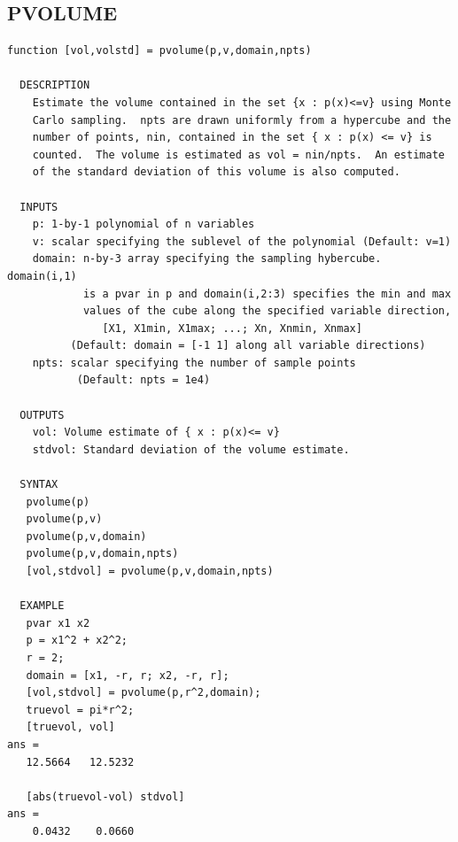 \documentclass{article}
\begin{document}
\subsection{PVOLUME}
\begin{verbatim}
function [vol,volstd] = pvolume(p,v,domain,npts)

  DESCRIPTION
    Estimate the volume contained in the set {x : p(x)<=v} using Monte
    Carlo sampling.  npts are drawn uniformly from a hypercube and the
    number of points, nin, contained in the set { x : p(x) <= v} is
    counted.  The volume is estimated as vol = nin/npts.  An estimate
    of the standard deviation of this volume is also computed.

  INPUTS
    p: 1-by-1 polynomial of n variables
    v: scalar specifying the sublevel of the polynomial (Default: v=1)
    domain: n-by-3 array specifying the sampling hybercube.  domain(i,1)
            is a pvar in p and domain(i,2:3) specifies the min and max
            values of the cube along the specified variable direction,
               [X1, X1min, X1max; ...; Xn, Xnmin, Xnmax]
          (Default: domain = [-1 1] along all variable directions)
    npts: scalar specifying the number of sample points
           (Default: npts = 1e4)

  OUTPUTS
    vol: Volume estimate of { x : p(x)<= v}
    stdvol: Standard deviation of the volume estimate.

  SYNTAX
   pvolume(p)
   pvolume(p,v)
   pvolume(p,v,domain)
   pvolume(p,v,domain,npts)
   [vol,stdvol] = pvolume(p,v,domain,npts)

  EXAMPLE
   pvar x1 x2
   p = x1^2 + x2^2;
   r = 2;
   domain = [x1, -r, r; x2, -r, r];
   [vol,stdvol] = pvolume(p,r^2,domain);
   truevol = pi*r^2;
   [truevol, vol]
ans =
   12.5664   12.5232

   [abs(truevol-vol) stdvol]
ans =
    0.0432    0.0660

\end{verbatim}

\newpage
\end{document}
